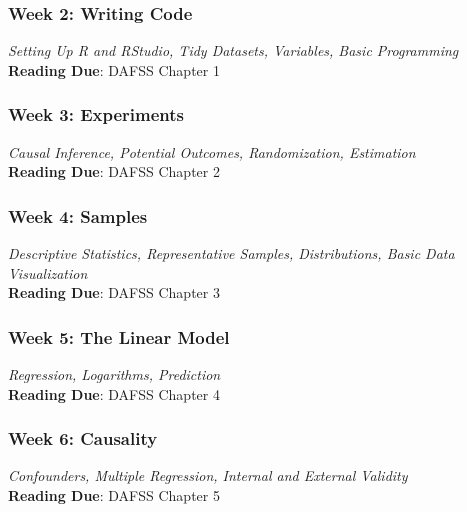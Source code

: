 \documentclass[11pt, letterpaper]{article}
\begin{document}
\subsubsection*{Week 2: Writing Code}
\textit{Setting Up R and RStudio, Tidy Datasets, Variables, Basic Programming}\\
\textbf{Reading Due}: DAFSS Chapter 1


\subsubsection*{Week 3: Experiments}
\textit{Causal Inference, Potential Outcomes, Randomization, Estimation}\\
\textbf{Reading Due}: DAFSS Chapter 2


\subsubsection*{Week 4: Samples}
\textit{Descriptive Statistics, Representative Samples, Distributions, Basic Data Visualization}\\
\textbf{Reading Due}: DAFSS Chapter 3


\subsubsection*{Week 5: The Linear Model}
\textit{Regression, Logarithms, Prediction}\\
\textbf{Reading Due}: DAFSS Chapter 4




\subsubsection*{Week 6: Causality}
\textit{Confounders, Multiple Regression, Internal and External Validity}\\
\textbf{Reading Due}: DAFSS Chapter 5
\end{document}
